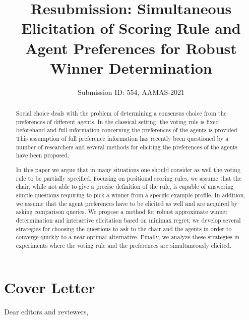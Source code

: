\documentclass[version=3.21, pagesize, twoside=off, bibliography=totoc, DIV=calc, fontsize=12pt, a4paper]{scrartcl}
\title{Resubmission: Simultaneous Elicitation of Scoring Rule and Agent Preferences for Robust Winner Determination}
\author{Submission ID: 554, AAMAS-2021}
\date{}
\begin{document}
\maketitle

\begin{abstract}
Social choice deals with the problem of determining a consensus choice from the preferences of different agents.
In the classical setting, the voting rule is fixed beforehand and full information concerning the preferences of the agents is provided.
This assumption of full preference information has recently been questioned by a number of researchers and
	several methods for eliciting the preferences of the agents have been proposed.

In this paper we argue that in many situations one should consider as well the voting rule to be 	partially specified.
	Focusing on positional scoring rules, we assume that the chair, while not able to give a precise definition of the rule, is capable of answering simple questions requiring to pick a winner from a specific example profile. In addition, we assume that the agent preferences have to be elicited as well and are acquired by asking comparison queries. 
	We propose a method for robust approximate winner determination and interactive elicitation based on minimax regret; we develop several strategies for choosing the questions to ask to  the chair and the agents in order to %
converge quickly to a near-optimal alternative. Finally, we analyze these strategies in experiments %
 where the voting rule and the preferences are simultaneously elicited.
\end{abstract}

\section{Cover Letter}
Dear editors and reviewers,
\end{document}
